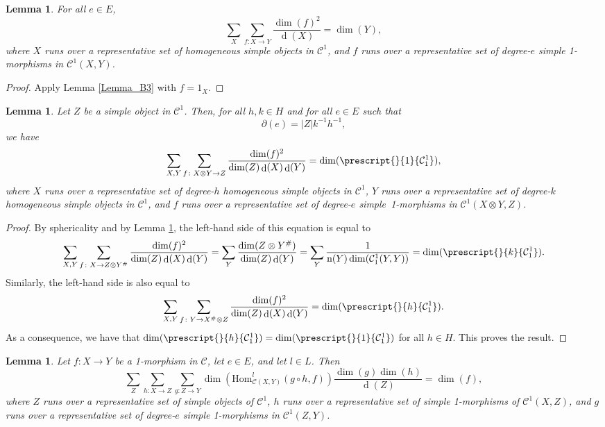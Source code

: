\documentclass[a4paper, oneside]{amsart}
\DeclareMathOperator{\wdim}{d}
\numberwithin{equation}{subsection}
\theoremstyle{referencedlemma}
\theoremstyle{plain} %
\newtheorem{lem}[equation]{Lemma}
\theoremstyle{remark}
\begin{document}
\begin{lem}\label{Lemma_B4}
For all $e\in E$, 
$$
\sum_{X}\sum_{f\colon X\to Y} \frac{\dim(f)^2}{\wdim(X)} = \dim(Y),
$$
where $X$ runs over a representative set of homogeneous simple objects in $\mathcal{C}^1$, and $f$ runs over a representative set of degree-$e$ simple 1-morphisms in $\mathcal{C}^1(X,Y)$. 
\end{lem}

\begin{proof}
Apply Lemma \ref{Lemma_B3} with $f = 1_X$. 
\end{proof}

\begin{lem}\label{Lemma_B5}
Let $Z$ be a simple object in $\mathcal{C}^1$.  Then, for all $h,k\in H$ and for all $e\in E$ such that $$
\partial(e) = \lvert Z \rvert k^{-1}h^{-1},
$$
we have
$$
\sum_{X, Y} \sum_{f\colon X\otimes Y\to Z} \frac{\dim(f)^2}{\dim(Z)\wdim(X)\wdim(Y)} = \dim(\prescript{}{1}{\mathcal{C}^1_1}),
$$
where $X$ runs over a representative set of degree-$h$ homogeneous simple objects in $\mathcal{C}^1$, $Y$ runs over a representative set of degree-$k$ homogeneous simple objects in $\mathcal{C}^1$, and $f$ runs over a representative set of degree-$e$ simple~1-morphisms in $\mathcal{C}^1(X\otimes Y, Z)$. 
\end{lem}
\begin{proof}
By sphericality and by Lemma \ref{Lemma_B4},  the left-hand side of this equation is equal to 
$$
\sum_{X,Y} \sum_{f\colon X\to Z\otimes Y^\#}  \frac{\dim(f)^2}{\dim(Z)\wdim(X)\wdim(Y)} = \sum_Y \frac{\dim(Z\otimes Y^\#)}{\dim(Z) \wdim(Y)} = \sum_Y \frac{1}{\mathrm{n}(Y) \dim(\mathcal{C}_1^1(Y,Y))} = \dim(\prescript{}{k}{\mathcal{C}_1^1}).
$$
Similarly, the left-hand side is also equal to
$$
\sum_{X,Y} \sum_{f\colon Y\to X^\#\otimes Z}  \frac{\dim(f)^2}{\dim(Z)\wdim(X)\wdim(Y)} = \dim(\prescript{}{h}{\mathcal{C}_1^1}).
$$
As a consequence, we have that $\dim(\prescript{}{h}{\mathcal{C}_1^1}) = \dim(\prescript{}{1}{\mathcal{C}_1^1})$ for all $h\in H$.  This proves the result. 
\end{proof}


\begin{lem}\label{Lemma_B6}
Let $f\colon X\to Y$ be a 1-morphism in $\mathcal{C}$, let $e\in E$, and let $l\in L$. Then
$$
\sum_Z \sum_{h\colon X\to Z} \sum_{g\colon Z \to Y} \dim(\mathrm{Hom}_{\mathcal{C}(X,Y)}^l(g\circ h, f) )\frac{\dim(g) \dim(h)}{\wdim(Z)} = \dim(f),
$$
where $Z$ runs over a representative set of simple objects of $\mathcal{C}^1$, $h$ runs over a representative set of simple 1-morphisms of $\mathcal{C}^1(X,Z)$, and $g$ runs over a representative set of degree-$e$ simple 1-morphisms in $\mathcal{C}^1(Z,Y)$. 
\end{lem}
\end{document}
